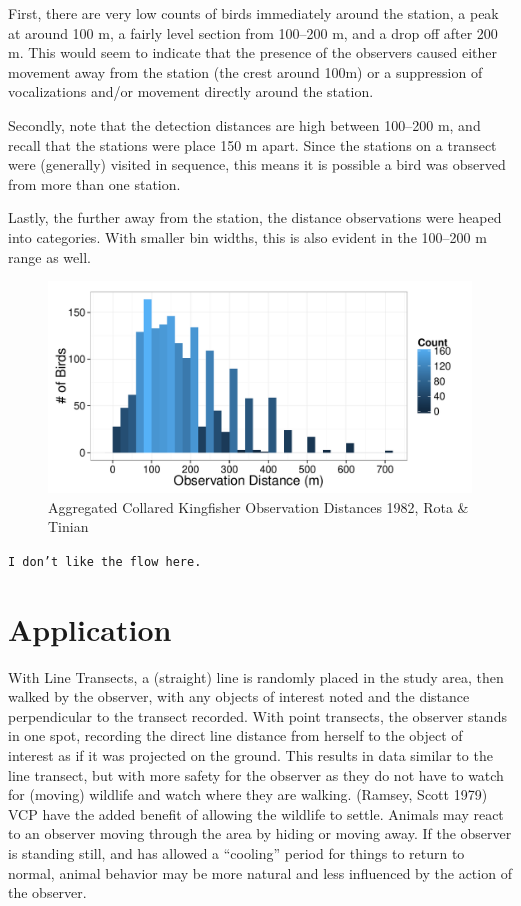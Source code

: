 \documentclass[12pt]{article}
\begin{document}
First, there are very low counts of birds immediately around the station, a peak at around 100 m, a fairly level section from 100--200 m, and a drop off after 200 m. This would seem to indicate that the presence of the observers caused either movement away from the station (the crest around 100m) or a suppression of vocalizations and/or movement directly around the station. 

Secondly, note that the detection distances are high between 100--200 m, and recall that the stations were place 150 m apart. Since the stations on a transect were (generally) visited in sequence, this means it is possible a bird was observed from more than one station. 

Lastly, the further away from the station, the distance observations were heaped into categories. With smaller bin widths, this is also evident in the 100--200 m range as well.



\begin{figure}
\caption{Aggregated Collared Kingfisher Observation Distances 1982, Rota \& Tinian}
\includegraphics[width=\textwidth]{../images/histogram_distance.pdf}
\end{figure}

\texttt{I don't like the flow here.}
\section{Application}
With Line Transects, a (straight) line is randomly placed in the study area, then walked by the observer, with any objects of interest noted and the distance perpendicular to the transect recorded. With point transects, the observer stands in one spot, recording the direct line distance from herself to the object of interest as if it was projected on the ground. This results in data similar to the line transect, but with more safety for the observer as they do not have to watch for (moving) wildlife and watch where they are walking. (Ramsey, Scott 1979) VCP have the added benefit of allowing the wildlife to settle. Animals may react to an observer moving through the area by hiding or moving away. If the observer is standing still, and has allowed a ``cooling'' period for things to return to normal, animal behavior may be more natural and less influenced by the action of the observer.
\end{document}
